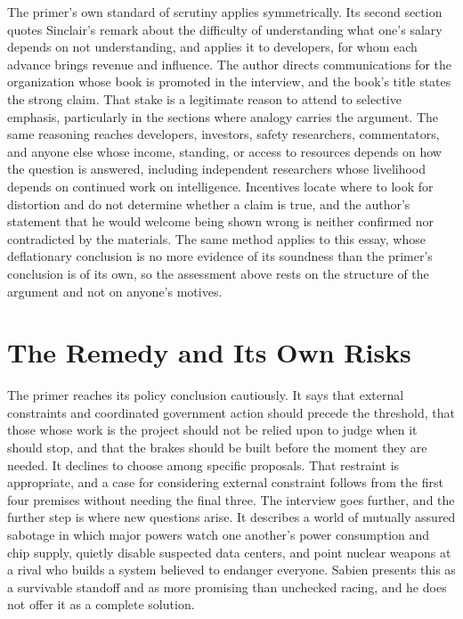 \documentclass[11pt]{article}
\begin{document}
The primer's own standard of scrutiny applies symmetrically. Its second section quotes Sinclair's remark about the difficulty of understanding what one's salary depends on not understanding, and applies it to developers, for whom each advance brings revenue and influence. The author directs communications for the organization whose book is promoted in the interview, and the book's title states the strong claim. That stake is a legitimate reason to attend to selective emphasis, particularly in the sections where analogy carries the argument. The same reasoning reaches developers, investors, safety researchers, commentators, and anyone else whose income, standing, or access to resources depends on how the question is answered, including independent researchers whose livelihood depends on continued work on intelligence. Incentives locate where to look for distortion and do not determine whether a claim is true, and the author's statement that he would welcome being shown wrong is neither confirmed nor contradicted by the materials. The same method applies to this essay, whose deflationary conclusion is no more evidence of its soundness than the primer's conclusion is of its own, so the assessment above rests on the structure of the argument and not on anyone's motives.

\section{The Remedy and Its Own Risks}

The primer reaches its policy conclusion cautiously. It says that external constraints and coordinated government action should precede the threshold, that those whose work is the project should not be relied upon to judge when it should stop, and that the brakes should be built before the moment they are needed. It declines to choose among specific proposals. That restraint is appropriate, and a case for considering external constraint follows from the first four premises without needing the final three. The interview goes further, and the further step is where new questions arise. It describes a world of mutually assured sabotage in which major powers watch one another's power consumption and chip supply, quietly disable suspected data centers, and point nuclear weapons at a rival who builds a system believed to endanger everyone. Sabien presents this as a survivable standoff and as more promising than unchecked racing, and he does not offer it as a complete solution.
\end{document}
